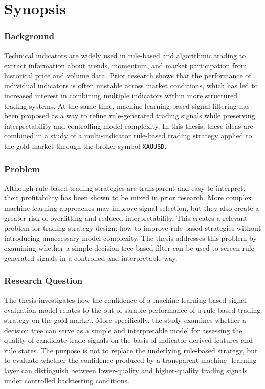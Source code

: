 
\chapter*{Synopsis}
\thispagestyle{empty}

\subsection*{Background}
Technical indicators are widely used in rule-based and algorithmic trading to
extract information about trends, momentum, and market participation from
historical price and volume data. Prior research shows that the performance of
individual indicators is often unstable across market conditions, which has led
to increased interest in combining multiple indicators within more structured
trading systems. At the same time, machine-learning-based signal filtering has
been proposed as a way to refine rule-generated trading signals while preserving
interpretability and controlling model complexity. In this thesis, these ideas
are combined in a study of a multi-indicator rule-based trading strategy applied
to the gold market through the broker symbol \texttt{XAUUSD}. 
\subsection*{Problem}
Although rule-based trading strategies are transparent and easy to interpret,
their profitability has been shown to be mixed in prior research. More complex
machine-learning approaches may improve signal selection, but they also create
a greater risk of overfitting and reduced interpretability. This creates a
relevant problem for trading strategy design: how to improve rule-based
strategies without introducing unnecessary model complexity. The thesis
addresses this problem by examining whether a simple decision-tree-based filter
can be used to screen rule-generated signals in a controlled and interpretable
way. 
\subsection*{Research Question}
The thesis investigates how the confidence of a machine-learning-based signal
evaluation model relates to the out-of-sample performance of a rule-based
trading strategy on the gold market. More specifically, the study examines whether
a decision tree can serve as a simple and interpretable model for assessing the
quality of candidate trade signals on the basis of indicator-derived features and
rule states. The purpose is not to replace the underlying rule-based strategy,
but to evaluate whether the confidence produced by a transparent machine-
learning layer can distinguish between lower-quality and higher-quality trading
signals under controlled backtesting conditions.
